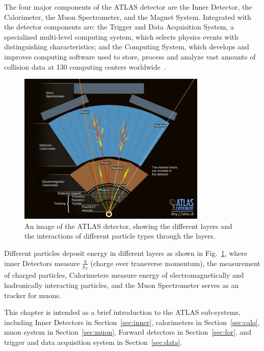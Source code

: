 \par The four major components of the ATLAS detector are the Inner Detector, the Calorimeter, the Muon Spectrometer, and the Magnet System. Integrated with the detector components are: the Trigger and Data Acquisition System, a specialized multi-level computing system, which selects physics events with distinguishing characteristics; and the Computing System, which develops and improves computing software used to store, process and analyze vast amounts of collision data at 130 computing centers worldwide~\cite{atlas}.

\begin{figure}[htbp]
    \centering
    \includegraphics[width=0.8\textwidth]{chapters/c4/figures/eve_gen.jpg}
    \caption{An image of the ATLAS detector, showing the different layers and the interactions of different particle types through the layers.}
    \label{fig:eve-gen}
\end{figure}

\par Different particles deposit energy in different layers as shown in Fig.~\ref{fig:eve-gen}, where inner Detectors measure $\frac{q}{p_T}$ (charge over transverse momentum), the measurement of charged particles, Calorimeters measure energy of electromagnetically and hadronically interacting particles, and the Muon Spectrometer serves as an tracker for muons.

\par This chapter is intended as a brief introduction to the ATLAS sub-systems, including Inner Detectors in Section~\ref{sec:inner}, calorimeters in Section~\ref{sec:calo}, muon system in Section~\ref{sec:muon}, Forward detectors in Section~\ref{sec:for}, and trigger and data acquisition system in Section~\ref{sec:data}.

